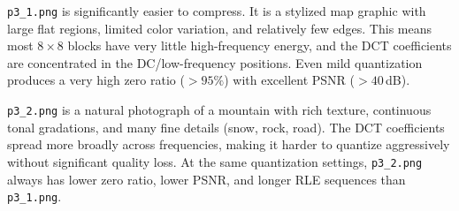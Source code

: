 \documentclass[11pt,a4paper]{article}
\begin{document}
\texttt{p3\_1.png} is significantly easier to compress.  It is a stylized map graphic with large flat regions, limited color variation, and relatively few edges.  This means most $8\times 8$ blocks have very little high-frequency energy, and the DCT coefficients are concentrated in the DC/low-frequency positions.  Even mild quantization produces a very high zero ratio ($>95\%$) with excellent PSNR ($>40$\,dB).

\texttt{p3\_2.png} is a natural photograph of a mountain with rich texture, continuous tonal gradations, and many fine details (snow, rock, road).  The DCT coefficients spread more broadly across frequencies, making it harder to quantize aggressively without significant quality loss.  At the same quantization settings, \texttt{p3\_2.png} always has lower zero ratio, lower PSNR, and longer RLE sequences than \texttt{p3\_1.png}.
\end{document}
